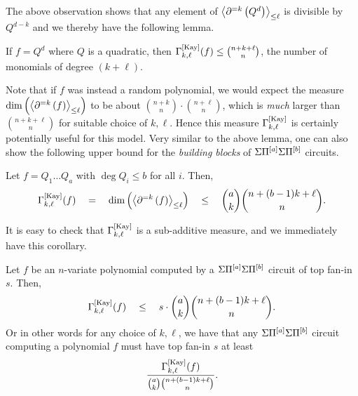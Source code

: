 

The above observation shows that any element of $\left\langle\partial^{=k}\left(Q^d\right)\right\rangle_{\leq \ell}$ is divisible by $Q^{d-k}$ and we thereby have the following lemma. 

\begin{lemma}
  If $f = Q^d$ where $Q$ is a quadratic, then $\Gamma^{\mathrm{[Kay]}}_{k,\ell}(f)\leq \binom{n + k + \ell}{n}$, the number of monomials of degree $(k + \ell)$. 
\end{lemma}

Note that if $f$ was instead a random polynomial, we would expect the measure  $\dim \left(\left\langle\partial^{=k}\left(f\right)\right\rangle_{\leq \ell}\right)$ to be about $\binom{n+k}{n} \cdot \binom{n+\ell}{n}$, which is \emph{much} larger than $\binom{n+k+\ell}{n}$ for suitable choice of $k,\ell$. 
Hence this measure $\Gamma^{\mathrm{[Kay]}}_{k,\ell}$ is certainly potentially useful for this model. 
Very similar to the above lemma, one can also show the following upper bound for the \emph{building blocks} of $\Sigma\Pi^{[a]}\Sigma\Pi^{[b]}$ circuits. 

\begin{lemma}
Let $f = Q_1\dots Q_a$ with $\deg Q_i \leq b$ for all $i$. 
Then, 
$$
\Gamma^{\mathrm{[Kay]}}_{k,\ell}(f) \quad = \quad \dim \left(\left\langle\partial^{=k}\left(f\right)\right\rangle_{\leq \ell}\right) \quad \leq \quad \binom{a}{k}\binom{n + (b-1)k + \ell}{n}.
$$
\end{lemma}

It is easy to check that $\Gamma^{\mathrm{[Kay]}}_{k,\ell}$ is a sub-additive measure, and we immediately have this corollary. 

\begin{corollary}\label{cor:dimSPD-upper-bound}
Let $f$ be an $n$-variate polynomial computed by a $\Sigma\Pi^{[a]}\Sigma\Pi^{[b]}$ circuit of top fan-in $s$. 
Then,
$$
\Gamma^{\mathrm{[Kay]}}_{k,\ell}(f) \quad \leq \quad s\cdot \binom{a}{k}\binom{n + (b-1)k + \ell}{n}.
$$
Or in other words for any choice of $k,\ell$, we have that any $\Sigma\Pi^{[a]}\Sigma\Pi^{[b]}$ circuit computing a polynomial $f$ must have top fan-in $s$ at least
$$\frac{\Gamma^{\mathrm{[Kay]}}_{k,\ell}(f)}{\binom{a}{k}\binom{n+(b-1)k + \ell}{n}}.$$ 
\end{corollary}



